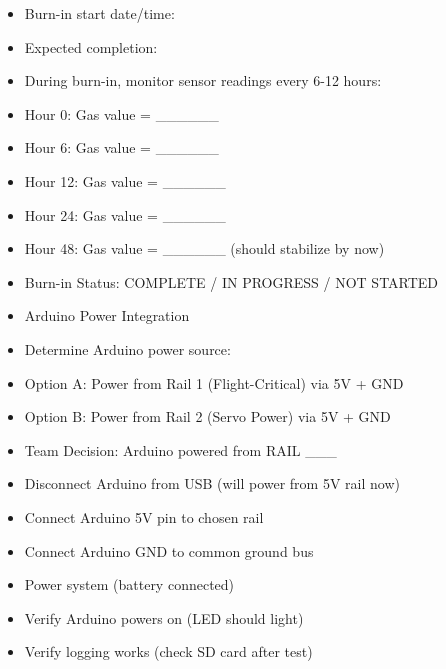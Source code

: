 \documentclass[11pt,letterpaper]{article}
\begin{document}
\begin{itemize}
  \item Burn-in start date/time: \underline{\hspace{4.05cm}}
  \item Expected completion: \underline{\hspace{4.05cm}}
  \item During burn-in, monitor sensor readings every 6-12 hours:
  \item Hour 0: Gas value = \_\_\_\_\_\_
  \item Hour 6: Gas value = \_\_\_\_\_\_
  \item Hour 12: Gas value = \_\_\_\_\_\_
  \item Hour 24: Gas value = \_\_\_\_\_\_
  \item Hour 48: Gas value = \_\_\_\_\_\_ (should stabilize by now)
  \item Burn-in Status: COMPLETE / IN PROGRESS / NOT STARTED
\end{itemize}

\begin{itemize}
  \item Arduino Power Integration
  \item Determine Arduino power source:
  \item Option A: Power from Rail 1 (Flight-Critical) via 5V + GND
  \item Option B: Power from Rail 2 (Servo Power) via 5V + GND
  \item Team Decision: Arduino powered from RAIL \_\_\_
\end{itemize}

\begin{itemize}
  \item Disconnect Arduino from USB (will power from 5V rail now)
  \item Connect Arduino 5V pin to chosen rail
  \item Connect Arduino GND to common ground bus
  \item Power system (battery connected)
  \item Verify Arduino powers on (LED should light)
  \item Verify logging works (check SD card after test)
\end{itemize}
\end{document}
